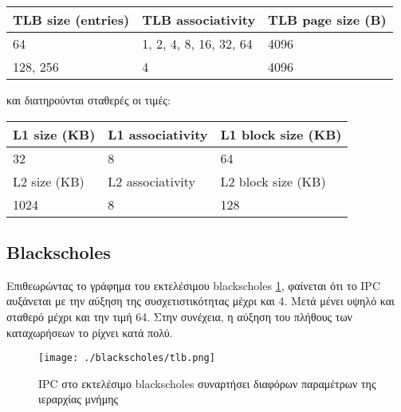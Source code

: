 \documentclass{article}
\newcommand{\eng}[1]{\foreignlanguage{english}{#1}}
\begin{document}
\begin{table}[h]
    \centering
    \begin{tabular}{|p{3cm}|p{3cm}|p{3cm}|}
        \hline
        TLB size (entries) & TLB associativity & TLB page size (B)\\
        \hline
        64 & 1, 2, 4, 8, 16, 32, 64 & 4096\\
        \hline
        128, 256 & 4 & 4096\\
        \hline
    \end{tabular}
\end{table}

και διατηρούνται σταθερές οι τιμές:

\begin{table}[h]
    \centering
    \begin{tabular}{|p{3cm}|p{3cm}|p{3cm}|}
        \hline
        L1 size (KB) & L1 associativity & L1 block size (KB)\\
        \hline
        \hline
        32 & 8 & 64\\
        \hline
        L2 size (KB) & L2 associativity & L2 block size (KB)\\
        \hline    
        \hline
        1024 & 8 & 128\\
        \hline
    \end{tabular}
\end{table}

\graphicspath{{../parsec-3.0/parsec_workspace/outputs/exp3/}}

\subsection{\eng{Blackscholes}}

Επιθεωρώντας το γράφημα του εκτελέσιμου \eng{blackscholes} \ref{fig:exp3-blackscholes}, φαίνεται ότι το \eng{IPC} αυξάνεται με την αύξηση της συσχετιστικότητας μέχρι και 4. Μετά μένει υψηλό και σταθερό μέχρι και την τιμή 64. Στην συνέχεια, η αύξηση του πλήθους των καταχωρήσεων το ρίχνει κατά πολύ.

\begin{figure}[h]
    \centering
    \texttt{[image: ./blackscholes/tlb.png]} 
    \caption{\eng{IPC} στο εκτελέσιμο \eng{blackscholes} συναρτήσει διαφόρων παραμέτρων της ιεραρχίας μνήμης}
    \label{fig:exp3-blackscholes}
\end{figure}
\FloatBarrier
\end{document}

